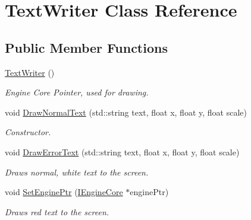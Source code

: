 \hypertarget{class_text_writer}{\section{Text\+Writer Class Reference}
\label{class_text_writer}
}
\subsection*{Public Member Functions}
\begin{DoxyCompactItemize}
\item 
\hypertarget{class_text_writer_ad77b980fabda2f931692263a56324446}{\hyperlink{class_text_writer_ad77b980fabda2f931692263a56324446}{Text\+Writer} ()}\label{class_text_writer_ad77b980fabda2f931692263a56324446}

\begin{DoxyCompactList}\small\item\em Engine Core Pointer, used for drawing. \end{DoxyCompactList}\item 
\hypertarget{class_text_writer_af26acc26d285763642169e19284392fb}{void \hyperlink{class_text_writer_af26acc26d285763642169e19284392fb}{Draw\+Normal\+Text} (std\+::string text, float x, float y, float scale)}\label{class_text_writer_af26acc26d285763642169e19284392fb}

\begin{DoxyCompactList}\small\item\em Constructor. \end{DoxyCompactList}\item 
\hypertarget{class_text_writer_a180fabccd3230c8765d0612e8097e9c5}{void \hyperlink{class_text_writer_a180fabccd3230c8765d0612e8097e9c5}{Draw\+Error\+Text} (std\+::string text, float x, float y, float scale)}\label{class_text_writer_a180fabccd3230c8765d0612e8097e9c5}

\begin{DoxyCompactList}\small\item\em Draws normal, white text to the screen. \end{DoxyCompactList}\item 
\hypertarget{class_text_writer_af0fc86c34a2eaab031625c6d4ba5cf03}{void \hyperlink{class_text_writer_af0fc86c34a2eaab031625c6d4ba5cf03}{Set\+Engine\+Ptr} (\hyperlink{class_i_engine_core}{I\+Engine\+Core} $\ast$engine\+Ptr)}\label{class_text_writer_af0fc86c34a2eaab031625c6d4ba5cf03}

\begin{DoxyCompactList}\small\item\em Draws red text to the screen. \end{DoxyCompactList}\end{DoxyCompactItemize}
